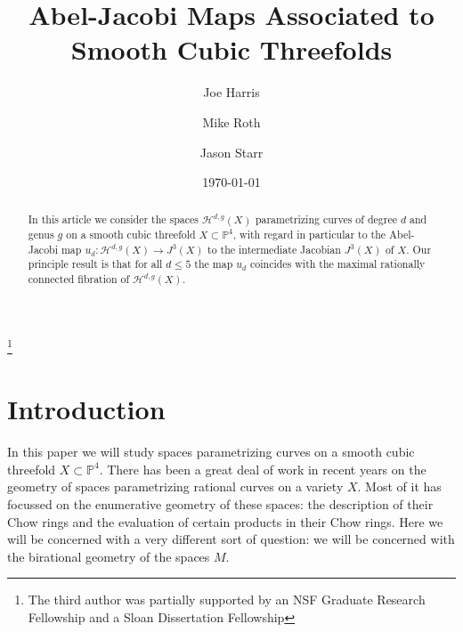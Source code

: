 \documentclass[amssymb,twoside,12 pt,amscd,reqno]{amsart}
\theoremstyle{plain}
\theoremstyle{definition}
\newcommand{\Hdg}[2]{\mathcal{H}^{#1,#2}}
\def\P{{\mathbb P}}
\def\ps{\vspace{4pt}}
\begin{document}
\title{Abel-Jacobi Maps Associated to Smooth Cubic Threefolds}
\author[Harris]{Joe Harris} 
\address{Department of Mathematics \\ Harvard University \\ Cambridge MA 02138}
\author[Roth]{Mike Roth} 
\address{Department of Mathematics \\ University of Michigan \\ Ann
Arbor, MI 48109}  
\author[Starr]{Jason Starr}\thanks{The third author was partially
supported by an NSF Graduate Research Fellowship and a Sloan
Dissertation Fellowship} 
\address{Department of Mathematics \\ Massachusetts Institute of Technology \\ Cambridge MA 02139}
\date{\today}

\maketitle

\tableofcontents

\begin{abstract}
In this article we consider the spaces $\Hdg{d}{g}(X)$ parametrizing
curves of degree $d$ and genus $g$ on a smooth cubic threefold $X
\subset \P^4$, with regard in particular to the Abel-Jacobi map $u_d :
\Hdg{d}{g}(X) \to J^3(X)$ to the intermediate Jacobian $J^3(X)$ of
$X$.  Our principle result is that for all $d \leq 5$ the map $u_d$
coincides with the maximal rationally connected fibration of
$\Hdg{d}{g}(X)$.
\end{abstract}

\section{Introduction} \label{sec-intro}

In this paper we will study spaces parametrizing curves on a smooth
cubic threefold $X \subset \P^4$. There has been a great deal of work
in recent years on the geometry of spaces parametrizing rational
curves on a variety $X$.  Most of it has focussed on the enumerative
geometry of these spaces: the description of their Chow rings and the
evaluation of certain products in their Chow rings. Here we will be
concerned with a very different sort of question: we will be concerned
with the birational geometry of the spaces $M$.

\ps
\end{document}
